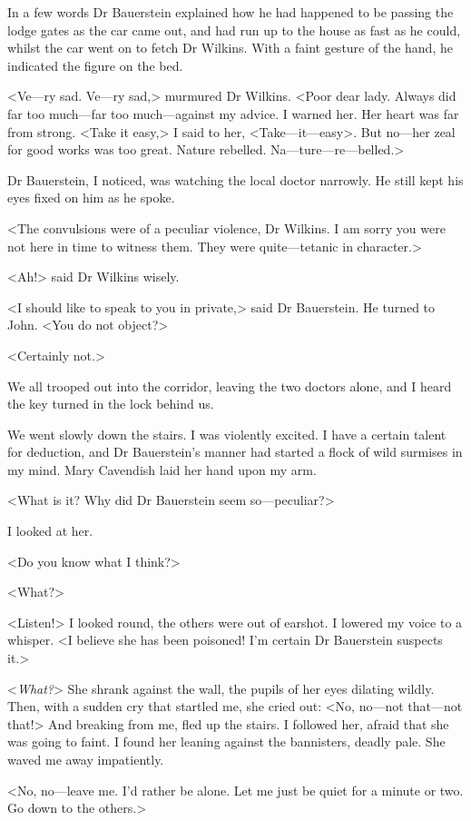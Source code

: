  In a few words Dr Bauerstein explained how he had happened to be passing the lodge gates as the car came out, and had run up to the house as fast as he could, whilst the car went on to fetch Dr Wilkins. With a faint gesture of the hand, he indicated the figure on the bed. 

 <Ve—ry sad. Ve—ry sad,> murmured Dr Wilkins. <Poor dear lady. Always did far too much—far too much—against my advice. I warned her. Her heart was far from strong. <Take it easy,> I said to her, <Take—it—easy>. But no—her zeal for good works was too great. Nature rebelled. Na—ture—re—belled.> 

 Dr Bauerstein, I noticed, was watching the local doctor narrowly. He still kept his eyes fixed on him as he spoke. 

 <The convulsions were of a peculiar violence, Dr Wilkins. I am sorry you were not here in time to witness them. They were quite—tetanic in character.> 

 <Ah!> said Dr Wilkins wisely. 

 <I should like to speak to you in private,> said Dr Bauerstein. He turned to John. <You do not object?> 

 <Certainly not.> 

 We all trooped out into the corridor, leaving the two doctors alone, and I heard the key turned in the lock behind us. 

 We went slowly down the stairs. I was violently excited. I have a certain talent for deduction, and Dr Bauerstein's manner had started a flock of wild surmises in my mind. Mary Cavendish laid her hand upon my arm. 

 <What is it? Why did Dr Bauerstein seem so—peculiar?> 

 I looked at her. 

 <Do you know what I think?> 

 <What?> 

 <Listen!> I looked round, the others were out of earshot. I lowered my voice to a whisper. <I believe she has been poisoned! I'm certain Dr Bauerstein suspects it.> 

 <\emph{What?}> She shrank against the wall, the pupils of her eyes dilating wildly. Then, with a sudden cry that startled me, she cried out: <No, no—not that—not that!> And breaking from me, fled up the stairs. I followed her, afraid that she was going to faint. I found her leaning against the bannisters, deadly pale. She waved me away impatiently. 

 <No, no—leave me. I'd rather be alone. Let me just be quiet for a minute or two. Go down to the others.> 

